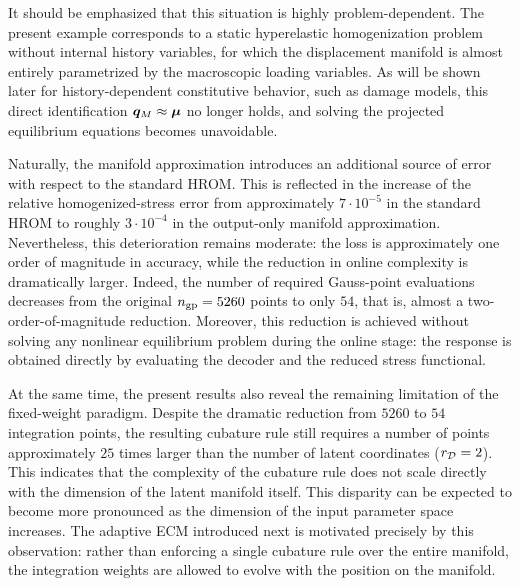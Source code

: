\documentclass[11pt,a4paper]{article}
\begin{document}
It should be emphasized that this situation is highly problem-dependent. The
present example corresponds to a static hyperelastic homogenization problem
without internal history variables, for which the displacement manifold is
almost entirely parametrized by the macroscopic loading variables. As will be
shown later for history-dependent constitutive behavior, such as damage models,
this direct identification $\bm{q}_M\approx\bm{\mu}$ no longer holds, and solving the
projected equilibrium equations becomes unavoidable.

Naturally, the manifold approximation introduces an additional source of error
with respect to the standard HROM. This is reflected in the increase of the
relative homogenized-stress error from approximately $7\cdot10^{-5}$ in the
standard HROM to roughly $3\cdot10^{-4}$ in the output-only manifold
approximation. Nevertheless, this deterioration remains moderate: the loss is
approximately one order of magnitude in accuracy, while the reduction in online
complexity is dramatically larger. Indeed, the number of required Gauss-point
evaluations decreases from the original $n_{\mathrm{gp}}=5260$ points to only $54$, that
is, almost a two-order-of-magnitude reduction. Moreover, this reduction is
achieved without solving any nonlinear equilibrium problem during the online
stage: the response is obtained directly by evaluating the decoder and the
reduced stress functional.



At the same time, the present results also reveal the remaining limitation of
the fixed-weight paradigm. Despite the dramatic reduction from $5260$ to $54$
integration points, the resulting cubature rule still requires a number of
points approximately $25$ times larger than the number of latent coordinates
($r_{\mathcal{D}}=2$). This indicates that the complexity of the cubature rule does not scale directly
with the dimension of the latent manifold itself.   This disparity can be expected to become
more pronounced as the dimension of the input parameter space increases. The
adaptive ECM introduced next is motivated precisely by this observation: rather
than enforcing a single cubature rule over the entire manifold, the integration
weights are allowed to evolve with the position on the manifold.
\end{document}
